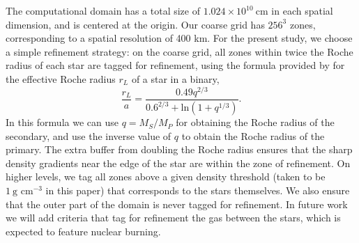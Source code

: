 \documentclass[iop,numberedappendix]{../emulateapj}
\begin{document}
The computational domain has a total size of $1.024 \times
10^{10}\ \text{cm}$ in each spatial dimension, and is centered at the
origin. Our coarse grid has $256^3$ zones, corresponding to a spatial
resolution of 400 km. For the present study, we choose a simple
refinement strategy: on the coarse grid, all zones within twice the Roche radius of each
star are tagged for refinement, using the formula provided by 
\citet{eggleton:1983} for the effective Roche radius $r_L$ of a star in a binary,
\begin{equation}
  \frac{r_L}{a} = \frac{0.49 q^{2/3}}{0.6^{2/3} + \text{ln}(1 + q^{1/3})}.
\end{equation}
In this formula we can use $q = M_S / M_P$ for obtaining the Roche radius of the secondary,
and use the inverse value of $q$ to obtain the Roche radius of the primary.
The extra buffer from doubling the Roche radius ensures that the sharp density gradients near
the edge of the star are within the zone of refinement. On higher levels, 
we tag all zones above a given density threshold (taken to be $1\ \text{g cm}^{-3}$ 
in this paper) that corresponds to the stars themselves. We also ensure
that the outer part of the domain is never tagged for refinement. In
future work we will add criteria that tag for refinement the gas
between the stars, which is expected to feature nuclear burning.
\end{document}
